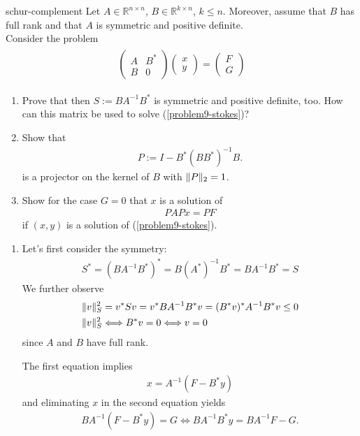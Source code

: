\begin{Problem}{schur-complement}
Let $A\in\mathbb{R}^{n\times n}$, $B\in\mathbb{R}^{k\times n}$, $k\leq n$.
Moreover, assume that $B$ has full rank and that $A$ is symmetric and
positive definite.\\
Consider the problem
\begin{align}
\begin{aligned}
\begin{pmatrix} A & B^* \\ B & 0 \end{pmatrix}
\begin{pmatrix} x \\ y \end{pmatrix}
= \begin{pmatrix} F \\ G \end{pmatrix}
\end{aligned}
\tag{*}
\label{problem9-stokes}
\end{align}
\begin{enumerate}
\item Prove that then $S := BA^{-1}B^*$ is symmetric and positive definite, too.
How can this matrix be used to solve (\ref{problem9-stokes})?
\item Show that
\begin{align*}
 P := I - B^*(BB^*)^{-1}B.
\end{align*}
is a projector on the kernel of $B$ with $\lVert P\rVert_2=1$.
\item Show for the case $G = 0$ that $x$ is a solution of
\begin{align*}
PAPx = PF
\end{align*}
if $(x,y)$ is a solution of (\ref{problem9-stokes}).
\end{enumerate}
\begin{solution}
\begin{enumerate}
 \item Let's first consider the symmetry:
  \begin{align*}
    S^*=(BA^{-1}B^*)^*=B(A^*)^{-1}B^*=BA^{-1}B^*=S
  \end{align*}
  We further observe
  \begin{align*}
   \lVert v\rVert_S^2 &= v^*Sv = v^*BA^{-1}B^*v = (B^*v)^*A^{-1}B^*v \leq 0 \\
   \lVert v\rVert_S^2 &\Longleftrightarrow B^*v = 0 \Longleftrightarrow v=0
  \end{align*}
  since $A$ and $B$ have full rank.

  The first equation implies
  \begin{align*}
   x=A^{-1} (F-B^* y)
  \end{align*}
  and eliminating $x$ in the second equation yields
  \begin{align*}
   BA^{-1} (F-B^* y)=G \Longleftrightarrow BA^{-1} B^* y=BA^{-1} F-G.
   \end{align*}


\end{enumerate}
\end{solution}
\end{Problem}
